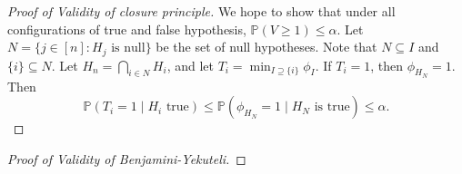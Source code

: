 \begin{proof}[Proof of Validity of closure principle]

We hope to show that under all configurations of true and false hypothesis, \(\mathbb{P}(V \geq 1) \leq \alpha\). Let \(N = \{j \in [n]: H_j \text{ is null}\}\) be the set of null hypotheses. Note that \(N \subseteq I\) and \(\{i\} \subseteq N\). Let \(H_n = \bigcap_{i \in N} H_i\), and let \(T_i = \min_{I \supseteq \{i\}} \phi_I \). If \(T_i = 1\), then \(\phi_{H_N} = 1\). Then
\[
\mathbb{P}(T_i = 1 \mid H_i \text{ true}) \leq \mathbb{P}(\phi_{H_N} = 1 \mid H_N \text{ is true}) \leq \alpha.
\]

\end{proof}

\begin{proof}[Proof of Validity of Benjamini-Yekuteli]


\end{proof}
